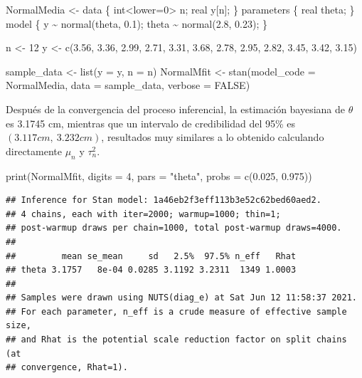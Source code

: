 \documentclass[
  10pt,
  spanish,
]{book}
\newenvironment{Shaded}{\begin{snugshade}}{\end{snugshade}}
\newcommand{\AttributeTok}[1]{\textcolor[rgb]{0.77,0.63,0.00}{#1}}
\newcommand{\ConstantTok}[1]{\textcolor[rgb]{0.00,0.00,0.00}{#1}}
\newcommand{\DecValTok}[1]{\textcolor[rgb]{0.00,0.00,0.81}{#1}}
\newcommand{\FloatTok}[1]{\textcolor[rgb]{0.00,0.00,0.81}{#1}}
\newcommand{\FunctionTok}[1]{\textcolor[rgb]{0.00,0.00,0.00}{#1}}
\newcommand{\NormalTok}[1]{#1}
\newcommand{\OtherTok}[1]{\textcolor[rgb]{0.56,0.35,0.01}{#1}}
\newcommand{\StringTok}[1]{\textcolor[rgb]{0.31,0.60,0.02}{#1}}
\theoremstyle{definition}
\theoremstyle{definition}
\theoremstyle{definition}
\theoremstyle{definition}
\theoremstyle{remark}
\begin{document}
\begin{Shaded}
\begin{Highlighting}[]
\NormalTok{NormalMedia }\OtherTok{\textless{}{-}} \StringTok{\textquotesingle{}}
\StringTok{data \{}
\StringTok{  int\textless{}lower=0\textgreater{} n;}
\StringTok{  real y[n];}
\StringTok{\}}
\StringTok{parameters \{}
\StringTok{  real theta;}
\StringTok{\}}
\StringTok{model \{}
\StringTok{  y \textasciitilde{} normal(theta, 0.1);}
\StringTok{  theta \textasciitilde{} normal(2.8, 0.23);}
\StringTok{\}}
\StringTok{\textquotesingle{}}

\NormalTok{n }\OtherTok{\textless{}{-}} \DecValTok{12}
\NormalTok{y }\OtherTok{\textless{}{-}} \FunctionTok{c}\NormalTok{(}\FloatTok{3.56}\NormalTok{, }\FloatTok{3.36}\NormalTok{, }\FloatTok{2.99}\NormalTok{, }\FloatTok{2.71}\NormalTok{, }\FloatTok{3.31}\NormalTok{, }\FloatTok{3.68}\NormalTok{, }
       \FloatTok{2.78}\NormalTok{, }\FloatTok{2.95}\NormalTok{, }\FloatTok{2.82}\NormalTok{, }\FloatTok{3.45}\NormalTok{, }\FloatTok{3.42}\NormalTok{, }\FloatTok{3.15}\NormalTok{)}

\NormalTok{sample\_data }\OtherTok{\textless{}{-}} \FunctionTok{list}\NormalTok{(}\AttributeTok{y =}\NormalTok{ y, }\AttributeTok{n =}\NormalTok{ n)}
\NormalTok{NormalMfit }\OtherTok{\textless{}{-}} \FunctionTok{stan}\NormalTok{(}\AttributeTok{model\_code =}\NormalTok{ NormalMedia,}
                   \AttributeTok{data =}\NormalTok{ sample\_data, }\AttributeTok{verbose =} \ConstantTok{FALSE}\NormalTok{)}
\end{Highlighting}
\end{Shaded}

Después de la convergencia del proceso inferencial, la estimación bayesiana de \(\theta\) es 3.1745 cm, mientras que un intervalo de credibilidad del 95\% es \((3.117 cm,\ 3.232 cm)\), resultados muy similares a lo obtenido calculando directamente \(\mu_n\) y \(\tau^2_n\).

\begin{Shaded}
\begin{Highlighting}[]
\FunctionTok{print}\NormalTok{(NormalMfit, }\AttributeTok{digits =} \DecValTok{4}\NormalTok{, }
      \AttributeTok{pars =} \StringTok{"theta"}\NormalTok{, }\AttributeTok{probs =} \FunctionTok{c}\NormalTok{(}\FloatTok{0.025}\NormalTok{, }\FloatTok{0.975}\NormalTok{))}
\end{Highlighting}
\end{Shaded}

\begin{verbatim}
## Inference for Stan model: 1a46eb2f3eff113b3e52c62bed60aed2.
## 4 chains, each with iter=2000; warmup=1000; thin=1; 
## post-warmup draws per chain=1000, total post-warmup draws=4000.
## 
##         mean se_mean     sd   2.5%  97.5% n_eff   Rhat
## theta 3.1757   8e-04 0.0285 3.1192 3.2311  1349 1.0003
## 
## Samples were drawn using NUTS(diag_e) at Sat Jun 12 11:58:37 2021.
## For each parameter, n_eff is a crude measure of effective sample size,
## and Rhat is the potential scale reduction factor on split chains (at 
## convergence, Rhat=1).
\end{verbatim}
\end{document}
